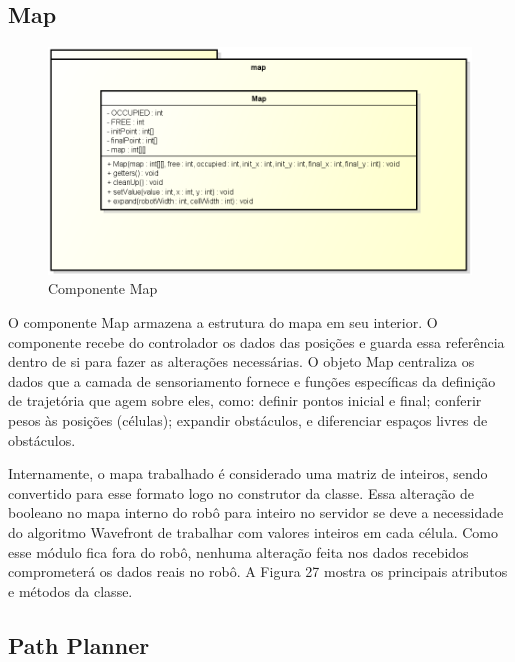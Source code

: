 \subsection{Map}

\begin{figure}[h]
	\centering
	\label{fig27}
		\includegraphics[keepaspectratio=true,scale=0.5]{figuras/pkgmap.png}
	\caption{Componente Map}
\end{figure}

O componente Map armazena a estrutura do mapa em seu interior. O componente recebe do controlador os dados das posições e guarda essa referência dentro de si para fazer as alterações necessárias. O objeto Map centraliza os dados que a camada de sensoriamento fornece e funções específicas da definição de trajetória que agem sobre eles, como: definir pontos inicial e final; conferir pesos às posições (células); expandir obstáculos, e diferenciar espaços livres de obstáculos.

Internamente, o mapa trabalhado é considerado uma matriz de inteiros, sendo convertido para esse formato logo no construtor da classe. Essa alteração de booleano no mapa interno do robô para inteiro no servidor se deve a necessidade do algoritmo Wavefront de trabalhar com valores inteiros em cada célula. Como esse módulo fica fora do robô, nenhuma alteração feita nos dados recebidos comprometerá os dados reais no robô. A Figura 27 mostra os principais atributos e métodos da classe.

\subsection{Path Planner}

